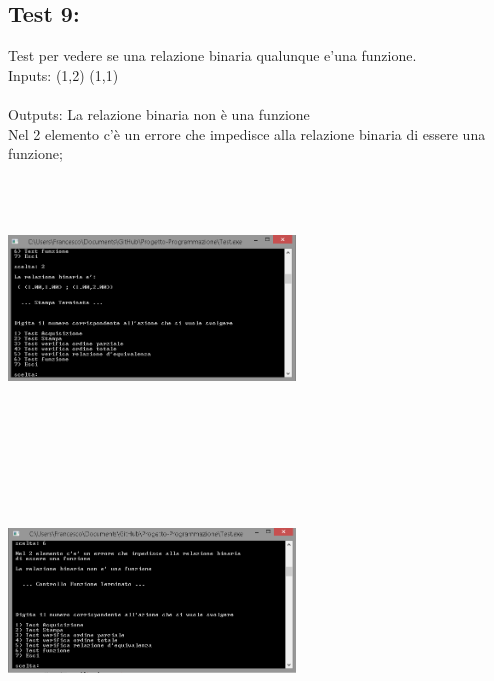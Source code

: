 \documentclass[11pt, a4paper, titlepage, block]{article}
\begin{document}
	\subsection{Test 9:}
	Test per vedere se una relazione binaria qualunque e'una funzione.\\
	Inputs: (1,2) (1,1) \\
	\\
	Outputs: La relazione binaria non \`e una funzione\\
	Nel 2 elemento c'\`e un errore che impedisce alla relazione binaria di essere una funzione;\\
	\includegraphics[width=3in,height=3in,viewport=0 0 300 300]{../Screenshots/Test9Input.png}
	\\
	\includegraphics[width=3in,height=3in,viewport=0 0 300 300]{../Screenshots/Test9Output.PNG}
	\\
	\\
	\newpage
\end{document}
